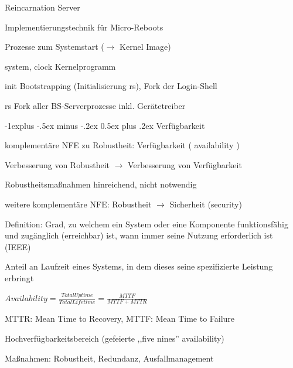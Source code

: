 \documentclass[a4paper]{article}
\makeatletter
\renewcommand{\subsection}{\@startsection{subsection}{2}{0mm}%
 {-1explus -.5ex minus -.2ex}%
 {0.5ex plus .2ex}%
 {\normalfont\normalsize\bfseries}}
\makeatother
\begin{document}
\begin{multicols}{3}
    Reincarnation Server
    \begin{itemize*}
        \item Implementierungstechnik für Micro-Reboots
        \item Prozesse zum Systemstart ($\rightarrow$ Kernel Image)
        \begin{description*}
            \item[system, clock] Kernelprogramm
            \item[init] Bootstrapping (Initialisierung rs), Fork der Login-Shell
            \item[rs] Fork aller BS-Serverprozesse inkl. Gerätetreiber
        \end{description*}
    \end{itemize*}

    \subsection{Verfügbarkeit}
    \begin{itemize*}
        \item komplementäre NFE zu Robustheit: Verfügbarkeit ( availability )
        \item Verbesserung von Robustheit $\rightarrow$ Verbesserung von Verfügbarkeit
        \item Robustheitsmaßnahmen hinreichend, nicht notwendig %
        \item weitere komplementäre NFE: Robustheit $\rightarrow$ Sicherheit (security)
        \item Definition: Grad, zu welchem ein System oder eine Komponente funktionsfähig und zugänglich (erreichbar) ist, wann immer seine Nutzung erforderlich ist (IEEE)
        \item Anteil an Laufzeit eines Systems, in dem dieses seine spezifizierte Leistung erbringt
        \item $Availability= \frac{Total Uptime}{Total Lifetime}= \frac{MTTF}{MTTF + MTTR}$
        \item MTTR: Mean Time to Recovery, MTTF: Mean Time to Failure
        \item Hochverfügbarkeitsbereich (gefeierte ,,five nines'' availability)
        \item Maßnahmen: Robustheit, Redundanz, Ausfallmanagement
    \end{itemize*}


\end{multicols}
\end{document}
